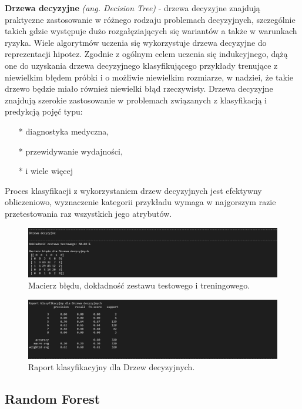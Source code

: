 \documentclass{article}
\begin{document}
\textbf{Drzewa decyzyjne} \emph{(ang. Decision Tree)} - drzewa decyzyjne znajdują praktyczne zastosowanie w różnego rodzaju problemach
decyzyjnych, szczególnie takich gdzie występuje dużo rozgałęziających się wariantów a także
w warunkach ryzyka. Wiele algorytmów uczenia się wykorzystuje drzewa decyzyjne do
reprezentacji hipotez. Zgodnie z ogólnym celem uczenia się indukcyjnego, dążą one do
uzyskania drzewa decyzyjnego klasyfikującego przykłady trenujące z niewielkim błędem
próbki i o możliwie niewielkim rozmiarze, w nadziei, że takie drzewo będzie miało również
niewielki błąd rzeczywisty. Drzewa decyzyjne znajdują szerokie zastosowanie w problemach
związanych z klasyfikacją i predykcją pojęć typu: 

\begin{itemize}
\item[*] diagnostyka medyczna, 
\item[*] przewidywanie wydajności, 
\item[*] i wiele więcej 
\end{itemize}
\textbf{} Proces klasyfikacji z wykorzystaniem drzew decyzyjnych jest efektywny obliczeniowo,
wyznaczenie kategorii przykładu wymaga w najgorszym razie przetestowania raz wszystkich
jego atrybutów. 
\newpage
\begin{figure}[!htb]
\centering
\includegraphics[width=\textwidth]{image/DD.png}
\caption{Macierz błędu, dokładność zestawu testowego i treningowego.}
\end{figure}

\begin{figure}[!htb]
\centering
\includegraphics[width=\textwidth]{image/raport_DD.png}
\caption{Raport klasyfikacyjny dla Drzew decyzyjnych.}
\end{figure}

\subsection{Random Forest}
\end{document}
